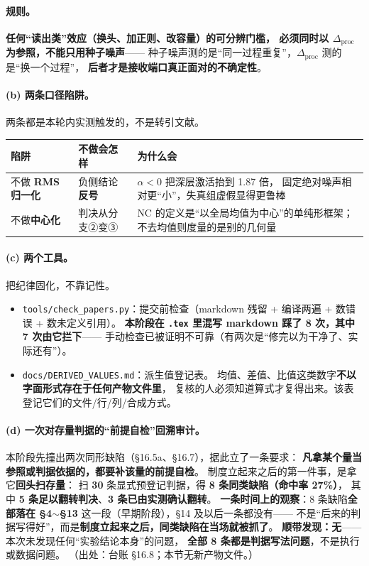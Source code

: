 \documentclass[11pt,a4paper]{ctexart}
\begin{document}
\paragraph{规则。}
\textbf{任何“读出类”效应（换头、加正则、改容量）的可分辨门槛，
必须同时以 $\Delta_{\text{proc}}$ 为参照，不能只用种子噪声}——
种子噪声测的是“同一过程重复”，$\Delta_{\text{proc}}$ 测的是“换一个过程”，
\textbf{后者才是接收端口真正面对的不确定性}。

\paragraph{(b) 两条口径陷阱。}
两条都是本轮内实测触发的，不是转引文献。

\begin{center}
\small
\begin{tabular}{llp{6.2cm}}
\toprule
陷阱 & 不做会怎样 & 为什么会 \\
\midrule
不做 \textbf{RMS 归一化} & 负侧结论\textbf{反号} & $\alpha<0$ 把深层激活抬到 1.87 倍，
  固定绝对噪声相对更“小”，失真组虚假显得更鲁棒 \\
不做\textbf{中心化} & 判决从分支②变③ & NC 的定义是“以全局均值为中心”的单纯形框架；
  不去均值则度量的是别的几何量 \\
\bottomrule
\end{tabular}
\end{center}

\paragraph{(c) 两个工具。}
把纪律固化，不靠记性。

\begin{itemize}[leftmargin=2em,itemsep=2pt]
  \item \texttt{tools/check\_papers.py}：提交前检查（markdown 残留 + 编译两遍 + 数错误 + 数未定义引用）。
        \textbf{本阶段在 \texttt{.tex} 里混写 markdown 踩了 8 次，其中 7 次由它拦下}——
        手动检查已被证明不可靠（有两次是“修完以为干净了、实际还有”）。
  \item \texttt{docs/DERIVED\_VALUES.md}：派生值登记表。
        均值、差值、比值这类数字\textbf{不以字面形式存在于任何产物文件里}，
        复核的人必须知道算式才复得出来。该表登记它们的文件/行/列/合成方式。
\end{itemize}

\paragraph{(d) 一次对存量判据的“前提自检”回溯审计。}
本阶段先撞出两次同形缺陷（§16.5a、§16.7），据此立了一条要求：
\textbf{凡拿某个量当参照或判据依据的，都要补该量的前提自检}。
制度立起来之后的第一件事，是拿它\textbf{回头扫存量}：
扫 \textbf{30} 条显式预登记判据，得 \textbf{8 条同类缺陷（命中率 27\%）}，
其中 \textbf{5 条足以翻转判决}、\textbf{3 条已由实测确认翻转}。
\textbf{一条时间上的观察}：8 条缺陷\textbf{全部落在 §4$\sim$§13} 这一段（早期阶段），§14 及以后一条都没有——
不是“后来的判据写得好”，而是\textbf{制度立起来之后，同类缺陷在当场就被抓了}。
\textbf{顺带发现：无}——本次未发现任何“实验结论本身”的问题，
\textbf{全部 8 条都是判据写法问题}，不是执行或数据问题。
（出处：台账 \S16.8；本节无新产物文件。）
\end{document}
